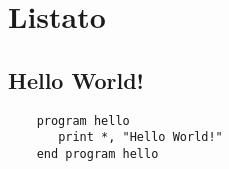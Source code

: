 \chapter{Listato}
\section{Hello World!}
\lstset{language=Fortran}
\begin{lstlisting}
    program hello
       print *, "Hello World!"
    end program hello
\end{lstlisting}
